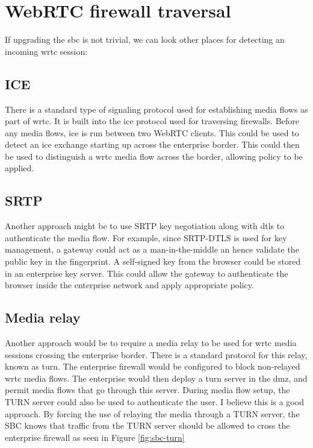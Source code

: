 \section{WebRTC firewall traversal}
If upgrading the \gls{sbc} is not trivial, we can look other places for detecting an incoming \gls{wrtc} session:

\subsection{ICE}
There is a standard type of signaling protocol used for establishing media flows as part of \gls{wrtc}. It is built into the \gls{ice} protocol used for traversing firewalls. Before any media flows, \gls{ice} is run between two WebRTC clients. This could be used to detect an \gls{ice} exchange starting up across the enterprise border. This could then be used to distinguish a \gls{wrtc} media flow across the border, allowing policy to be applied.

\subsection{SRTP}
Another approach might be to use SRTP key negotiation along with \gls{dtls} to authenticate the media flow. For example, since SRTP-DTLS is used for key management, a gateway could act as a man-in-the-middle an hence validate the public key in the fingerprint. A self-signed key from the browser could be stored in an enterprise key server. This could allow the gateway to authenticate the browser inside the enterprise network and apply appropriate policy.

\subsection{Media relay}
Another approach would be to require a media relay to be used for \gls{wrtc} media sessions crossing the enterprise border. There is a standard protocol for this relay, known as \gls{turn}. The enterprise firewall would be configured to block non-relayed \gls{wrtc} media flows. The enterprise would then deploy a \gls{turn} server in the \gls{dmz}, and permit media flows that go through this server. During media flow setup, the TURN server could also be used to authenticate the user. I believe this is a good approach. By forcing the use of relaying the media through a TURN server, the SBC knows that traffic from the TURN server should be allowed to cross the enterprise firewall as seen in Figure \ref{fig:sbc-turn}

